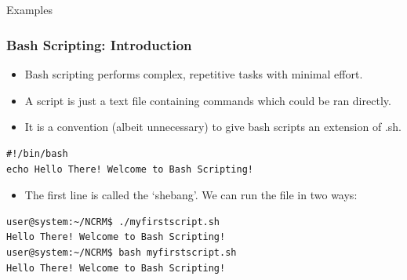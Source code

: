 \documentclass[10pt]{beamer}
\begin{document}
\subsection{}
\begin{frame}[fragile]{Examples}
\frametitle{Bash Scripting: Introduction}
\begin{itemize}
\item Bash scripting performs complex, repetitive tasks with minimal effort.\vspace{0.05in}
\item A script is just a text file containing commands which could be ran directly.\vspace{0.05in}
\item It is a convention (albeit unnecessary) to give bash scripts an extension of .sh.
\end{itemize}
\begin{lstlisting}[style=BashInputStyle,title=Our first script: \texttt{myfirstscript.sh}]
#!/bin/bash
echo Hello There! Welcome to Bash Scripting!
\end{lstlisting}\vspace{0.05in}
\begin{itemize}
\item The first line is called the `shebang'. We can run the file in two ways:
\end{itemize}
\begin{lstlisting}[style=BashInputStyle,title=Executing \texttt{myfirstscript.sh}]
user@system:~/NCRM$ ./myfirstscript.sh
Hello There! Welcome to Bash Scripting!
user@system:~/NCRM$ bash myfirstscript.sh
Hello There! Welcome to Bash Scripting!
\end{lstlisting}
\end{frame}
\end{document}
